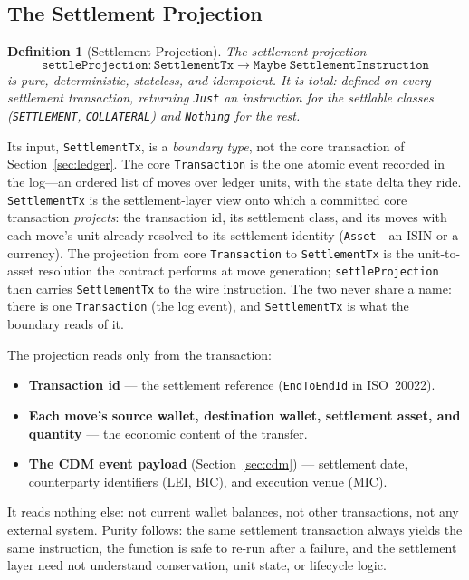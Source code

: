 \documentclass[11pt,a4paper]{article}
\newtheorem{definition}{Definition}[section]
\begin{document}
\subsection{The Settlement Projection}
\label{sec:settlement-projection}

\begin{definition}[Settlement Projection]
\label{def:settle-projection}
The settlement projection
\[
\texttt{settleProjection} : \texttt{SettlementTx} \to \texttt{Maybe}\ \texttt{SettlementInstruction}
\]
is pure, deterministic, stateless, and idempotent. It is total: defined on every settlement transaction, returning \texttt{Just} an instruction for the settlable classes (\texttt{SETTLEMENT}, \texttt{COLLATERAL}) and \texttt{Nothing} for the rest.
\end{definition}

Its input, \texttt{SettlementTx}, is a \emph{boundary type}, not the core transaction of Section~\ref{sec:ledger}. The core \texttt{Transaction} is the one atomic event recorded in the log---an ordered list of moves over ledger units, with the state delta they ride. \texttt{SettlementTx} is the settlement-layer view onto which a committed core transaction \emph{projects}: the transaction id, its settlement class, and its moves with each move's unit already resolved to its settlement identity (\texttt{Asset}---an ISIN or a currency). The projection from core \texttt{Transaction} to \texttt{SettlementTx} is the unit-to-asset resolution the contract performs at move generation; \texttt{settleProjection} then carries \texttt{SettlementTx} to the wire instruction. The two never share a name: there is one \texttt{Transaction} (the log event), and \texttt{SettlementTx} is what the boundary reads of it.

The projection reads only from the transaction:
\begin{itemize}[nosep]
\item \textbf{Transaction id} --- the settlement reference (\texttt{EndToEndId} in ISO~20022).
\item \textbf{Each move's source wallet, destination wallet, settlement asset, and quantity} --- the economic content of the transfer.
\item \textbf{The CDM event payload} (Section~\ref{sec:cdm}) --- settlement date, counterparty identifiers (LEI, BIC), and execution venue (MIC).
\end{itemize}

It reads nothing else: not current wallet balances, not other transactions, not any external system. Purity follows: the same settlement transaction always yields the same instruction, the function is safe to re-run after a failure, and the settlement layer need not understand conservation, unit state, or lifecycle logic.
\end{document}
